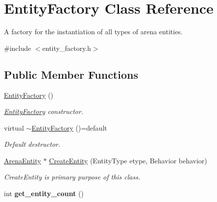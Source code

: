 \hypertarget{class_entity_factory}{}\section{Entity\+Factory Class Reference}
\label{class_entity_factory}


A factory for the instantiation of all types of arena entities.  




{\ttfamily \#include $<$entity\+\_\+factory.\+h$>$}

\subsection*{Public Member Functions}
\begin{DoxyCompactItemize}
\item 
\mbox{\label{class_entity_factory_abaf0c4ceaa682e55f69b0ceae230008a}} 
\mbox{\hyperlink{class_entity_factory_abaf0c4ceaa682e55f69b0ceae230008a}{Entity\+Factory}} ()
\begin{DoxyCompactList}\small\item\em \mbox{\hyperlink{class_entity_factory}{Entity\+Factory}} constructor. \end{DoxyCompactList}\item 
\mbox{\label{class_entity_factory_ae3246f06fa101178803f76582323d4ad}} 
virtual \mbox{\hyperlink{class_entity_factory_ae3246f06fa101178803f76582323d4ad}{$\sim$\+Entity\+Factory}} ()=default
\begin{DoxyCompactList}\small\item\em Default destructor. \end{DoxyCompactList}\item 
\mbox{\hyperlink{class_arena_entity}{Arena\+Entity}} $\ast$ \mbox{\hyperlink{class_entity_factory_af8366cb210cfb13f94b8eeb502e805fc}{Create\+Entity}} (Entity\+Type etype, Behavior behavior)
\begin{DoxyCompactList}\small\item\em Create\+Entity is primary purpose of this class. \end{DoxyCompactList}\item 
\mbox{\label{class_entity_factory_a8c419808ccf0f71fb35ac77eed30fc30}} 
int {\bfseries get\+\_\+entity\+\_\+count} ()
\item 

\end{DoxyCompactItemize}
